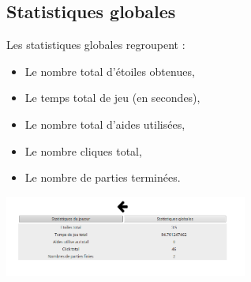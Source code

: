 \documentclass[a4paper, 12pt]{report}
\begin{document}
		\subsection{Statistiques globales}

		    Les statistiques globales regroupent :
		    \begin{itemize}
                    \item Le nombre total d'étoiles obtenues,
                    \item Le temps total de jeu (en secondes),
                    \item Le nombre total d'aides utilisées,
                    \item Le nombre cliques total,
                    \item Le nombre de parties terminées.
            \end{itemize}
            
            \begin{minipage}{\linewidth}
                    \centering
			        \includegraphics[width=8cm]{StatsGlobales.png}
	        \end{minipage}

		
		
\end{document}
